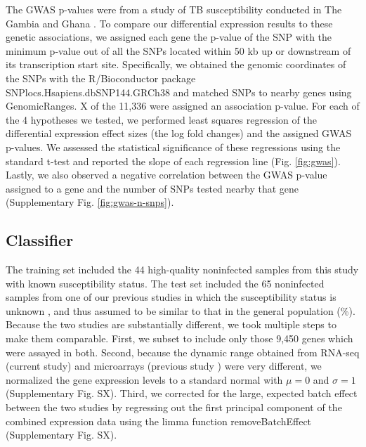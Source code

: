 \documentclass[fleqn,10pt]{wlscirep}
\begin{document}
The GWAS p-values were from a study of TB susceptibility conducted in
The Gambia and Ghana \cite{Thye2010}. To compare our differential
expression results to these genetic associations, we assigned each
gene the p-value of the SNP with the minimum p-value out of all the
SNPs located within 50 kb up or downstream of its transcription start
site. Specifically, we obtained the genomic coordinates of the SNPs
with the R/Bioconductor package SNPlocs.Hsapiens.dbSNP144.GRCh38 and
matched SNPs to nearby genes using GenomicRanges. X of the 11,336 were
assigned an association p-value. For each of the 4 hypotheses we
tested, we performed least squares regression of the differential
expression effect sizes (the log fold changes) and the assigned GWAS
p-values. We assessed the statistical significance of these
regressions using the standard t-test and reported the slope of each
regression line (Fig. \ref{fig:gwas}).  Lastly, we also observed a
negative correlation between the GWAS p-value assigned to a gene and
the number of SNPs tested nearby that gene (Supplementary Fig.
\ref{fig:gwas-n-snps}).
\subsection*{Classifier}

The training set included the 44 high-quality noninfected samples from
this study with known susceptibility status. The test set included the
65 noninfected samples from one of our previous studies in which the
susceptibility status is unknown \cite{Barreiro2012}, and thus assumed
to be similar to that in the general population (\%).
Because the two studies are substantially different, we took multiple
steps to make them comparable. First, we subset to include only those
9,450 genes which were assayed in both. Second, because the dynamic
range obtained from RNA-seq (current study) and microarrays (previous
study \cite{Barreiro2012}) were very different, we normalized the gene
expression levels to a standard normal with $\mu = 0$ and $\sigma = 1$
(Supplementary Fig. SX). Third, we corrected for the large, expected
batch effect between the two studies by regressing out the first
principal component of the combined expression data using the limma
function removeBatchEffect \cite{Ritchie2015} (Supplementary Fig. SX).
\end{document}
